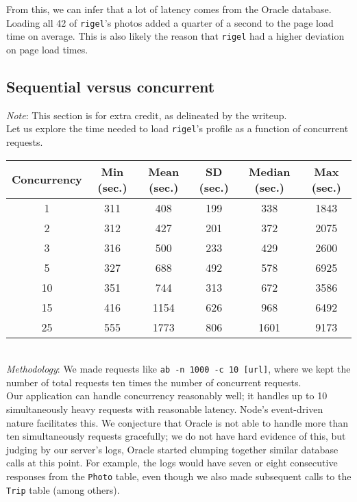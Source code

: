 \documentclass[11pt]{amsart}
\begin{document}
From this, we can infer that a lot of latency comes from the Oracle database. Loading all 42 of
{\tt rigel}'s photos added a quarter of a second to the page load time on average. This is also
likely the reason that {\tt rigel} had a higher deviation on page load times.

\subsection{Sequential versus concurrent}
{\em Note}: This section is for extra credit, as delineated by the writeup. \\

Let us explore the time needed to load {\tt rigel}'s profile as a function of concurrent requests. \\

\begin{tabular}{|c|c|c|c|c|c|}
  \hline {\bf Concurrency} & {\bf Min (sec.)} & {\bf Mean (sec.)} & {\bf SD (sec.)} & 
    {\bf Median (sec.)} & {\bf Max (sec.)} \\
  \hline 1 & 311 & 408 & 199 & 338 & 1843 \\
  \hline 2 & 312 & 427 & 201 & 372 & 2075 \\
  \hline 3 & 316 & 500 & 233 & 429 & 2600 \\
  \hline 5 & 327 & 688 & 492 & 578 & 6925 \\
  \hline 10 & 351 & 744 & 313 & 672 & 3586 \\
  \hline 15 & 416 & 1154 & 626 & 968 & 6492 \\
  \hline 25 & 555 & 1773 & 806 & 1601 & 9173 \\
  \hline
\end{tabular} \\

{\em Methodology}: We made requests like {\tt ab -n 1000 -c 10 [url]}, where we kept the number of
total requests ten times the number of concurrent requests. \\

Our application can handle concurrency reasonably well; it handles up to 10 simultaneously heavy
requests with reasonable latency. Node's event-driven nature facilitates this. We conjecture that
Oracle is not able to handle more than ten simultaneously requests gracefully; we do not have
hard evidence of this, but judging by our server's logs, Oracle started clumping together similar
database calls at this point. For example, the logs would have seven or eight consecutive
responses from the {\tt Photo} table, even though we also made subsequent calls to the {\tt Trip}
table (among others). \\
\end{document}
